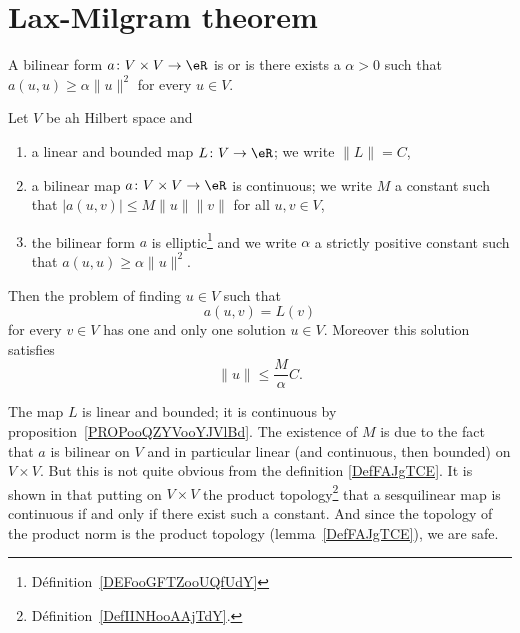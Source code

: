 
\section{Lax-Milgram theorem}

\begin{definition}  \label{DEFooGFTZooUQfUdY}
    A bilinear form \( a\colon V\times V\to \eR\) is  or  is there exists a \( \alpha>0\) such that \( a(u,u)\geq \alpha\| u \|^2\) for every \( u\in V\).
\end{definition}

\begin{theorem}       \label{THOooFDJYooCSNnuv}
    Let \( V\) be ah Hilbert space and
    \begin{enumerate}
        \item
            a linear and bounded map \( L\colon V\to \eR\); we write \( \| L \|=C\),
        \item
            a bilinear map \( a\colon V\times V\to \eR\) is continuous; we write \( M\) a constant such that \( | a(u,v) |\leq M\| u \|\| v \|\) for all \( u,v\in V\),
        \item
            the bilinear form \( a\) is elliptic\footnote{Définition~\ref{DEFooGFTZooUQfUdY}} and we write \( \alpha\) a strictly positive constant such that \( a(u,u)\geq \alpha\| u \|^2\).
    \end{enumerate}
    Then the problem of finding \( u\in V\) such that
    \begin{equation}
        a(u,v)=L(v)
    \end{equation}
    for every \( v\in V\) has one and only one solution \( u\in V\). Moreover this solution satisfies
    \begin{equation}
        \| u \|\leq \frac{ M }{ \alpha }C.
    \end{equation}
\end{theorem}
The map \( L\) is linear and bounded; it is continuous by proposition~\ref{PROPooQZYVooYJVlBd}. The existence of \( M\) is due to the fact that \( a\) is bilinear on \( V\) and in particular linear (and continuous, then bounded) on \( V\times V\). But this is not quite obvious from the definition \eqref{DefFAJgTCE}. It is shown in \cite{ooCUHNooNYIeGt} that putting on \( V\times V\) the product topology\footnote{Définition~\ref{DefIINHooAAjTdY}.} that a sesquilinear map is continuous if and only if there exist such a constant. And since the topology of the product norm is the product topology (lemma~\ref{DefFAJgTCE}), we are safe.

